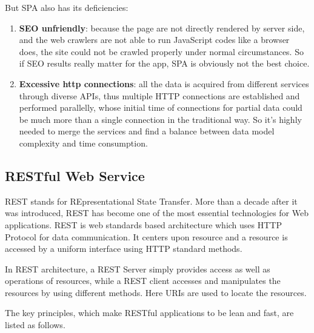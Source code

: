 But SPA also has its deficiencies:

\begin{enumerate}
\item
\textbf{\gls{SEO} unfriendly}: because the page are not directly rendered by server side, and the web crawlers are not able to run JavaScript codes like a browser does, the site could not be crawled properly under normal circumstances. So if SEO results really matter for the app, SPA is obviously not the best choice.
\item
\textbf{Excessive http connections}: all the data is acquired from different services through diverse \gls{API}s, thus multiple HTTP connections are established and performed parallelly, whose initial time of connections for partial data could be much more than a single connection in the traditional way. So it's highly needed to merge the services and find a balance between data model complexity and time consumption.
\end{enumerate}


\subsection{RESTful Web Service}
REST stands for REpresentational State Transfer. More than a decade after it was introduced, REST has become one of the most essential technologies for Web applications\cite{richardson2008restful}. REST is web standards based architecture which uses HTTP Protocol for data communication. It  centers upon resource  and a resource is accessed by a uniform interface using HTTP standard methods.

In REST architecture, a REST Server simply provides access as well as operations of resources, while a  REST client accesses and manipulates the resources by using different methods. Here URIs are used to locate the resources.


The key principles, which make RESTful applications to be lean and fast, are listed as follows\cite{hamad2010performance}.

